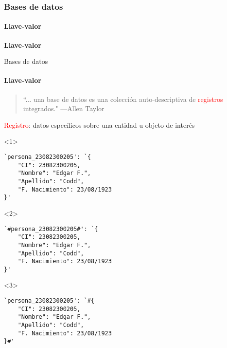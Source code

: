 \begin{frame}
    \frametitle{Bases de datos}
    \framesubtitle{Llave-valor}

\begin{center}
    \Huge \textbf{Llave-valor}
\end{center}
\end{frame}

\begin{frame}[fragile]{Bases de datos}
    \framesubtitle{Llave-valor}

    \begin{overlayarea}{\linewidth}{\textheight}
        \begin{onlyenv}
            \begin{block}{}
                \begin{quote}
                    ``... una base de datos es una colecci\'on auto-descriptiva de \textcolor{red}{registros} integrados."
                    \hspace{1em plus 1fill}---Allen Taylor
                \end{quote}
                
                \textcolor{red}{Registro}: datos espec\'ificos sobre una entidad u objeto de inter\'es
            \end{block}
      \end{onlyenv}
      \vspace{2mm}
      \begin{center}
        
\begin{minipage}{0.6\textwidth}
    \begin{onlyenv}<1>
\begin{lstlisting}[language=text]
`persona_23082300205': `{  
    "CI": 23082300205, 
    "Nombre": "Edgar F.", 
    "Apellido": "Codd", 
    "F. Nacimiento": 23/08/1923 
}'
\end{lstlisting}
    \end{onlyenv}

    \begin{onlyenv}<2>
\begin{lstlisting}[language=text]
`#persona_23082300205#': `{  
    "CI": 23082300205, 
    "Nombre": "Edgar F.", 
    "Apellido": "Codd", 
    "F. Nacimiento": 23/08/1923 
}'
\end{lstlisting}
    \end{onlyenv}

\begin{onlyenv}<3>
\begin{lstlisting}[language=text]
`persona_23082300205': `#{  
    "CI": 23082300205, 
    "Nombre": "Edgar F.", 
    "Apellido": "Codd", 
    "F. Nacimiento": 23/08/1923 
}#'
\end{lstlisting}
\end{onlyenv}


\end{minipage}
\end{center}
\end{overlayarea}
\end{frame}
